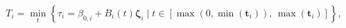 \begin{equation}
  T_{i} = \min_{t} \left\{
    \tau_{i} = \beta_{0, i} + B_{i}(t)\boldsymbol{\zeta}_{i}
    \mid
    t \in [\max(0, \min(\boldsymbol{t}_{i})),\, \max(\boldsymbol{t}_{i})]
  \right\},
  \label{eqn:event-time-model-def}
\end{equation}